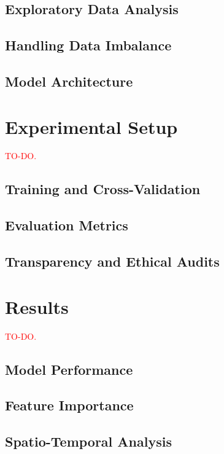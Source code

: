 \documentclass[journal]{IEEEtran}
\newcommand{\todo}{\textcolor{red}{TO-DO.} }
\begin{document}
    \subsection{Exploratory Data Analysis}

    \subsection{Handling Data Imbalance}

    \subsection{Model Architecture}


    \section{Experimental Setup}

    \todo

    \subsection{Training and Cross-Validation}

    \subsection{Evaluation Metrics}

    \subsection{Transparency and Ethical Audits}


    \section{Results}

    \todo

    \subsection{Model Performance}

    \subsection{Feature Importance}

    \subsection{Spatio-Temporal Analysis}
\end{document}
